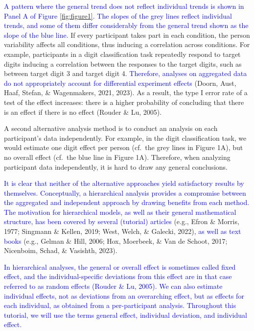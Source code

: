 \documentclass[
  english,
  doc,floatsintext]{apa6}
\begin{document}
\textcolor{blue}{A pattern where the general trend does not reflect individual trends is shown in Panel A of Figure} \ref{fig:figure1}\textcolor{blue}{. The slopes of the grey lines reflect individual trends, and some of them differ considerably from the general trend shown as the slope of the blue line.} If every participant takes part in each condition, the person variability affects all conditions, thus inducing a correlation across conditions. For example, participants in a digit classification task repeatedly respond to target digits inducing a correlation between the responses to the target digits, such as between target digit 3 and target digit 4. \textcolor{blue}{Therefore, analyses on aggregated data do not appropriately account for differential experiment effects} (Doorn, Aust, Haaf, Stefan, \& Wagenmakers, 2021, 2023). As a result, the type I error rate of a test of the effect increases: there is a higher probability of concluding that there is an effect if there is no effect (Rouder \& Lu, 2005).

A second alternative analysis method is to conduct an analysis on each participant's data independently. For example, in the digit classification task, we would estimate one digit effect per person (cf.~the grey lines in Figure 1A), but no overall effect (cf.~the blue line in Figure 1A). Therefore, when analyzing participant data independently, it is hard to draw any general conclusions.

\textcolor{blue}{It is clear that neither of the alternative approaches yield satisfactory results by themselves. Conceptually, a hierarchical analysis provides a compromise between the aggregated and independent approach by drawing benefits from each method. The motivation for hierarchical models, as well as their general mathematical structure, has been covered by several (tutorial) articles} (e.g., Efron \& Morris, 1977; Singmann \& Kellen, 2019; West, Welch, \& Galecki, 2022)\textcolor{blue}{, as well as text books} (e.g., Gelman \& Hill, 2006; Hox, Moerbeek, \& Van de Schoot, 2017; Nicenboim, Schad, \& Vasishth, 2023).

\textcolor{blue}{In hierarchical analyses, the general or overall effect is sometimes called fixed effect, and the individual-specific deviations from this effect are in that case referred to as random effects (Rouder \& Lu, 2005). We can also estimate individual effects, not as deviations from an overarching effect, but as effects for each individual, as obtained from a per-participant analysis. Throughout this tutorial, we will use the terms general effect, individual deviation, and individual effect.}
\end{document}
